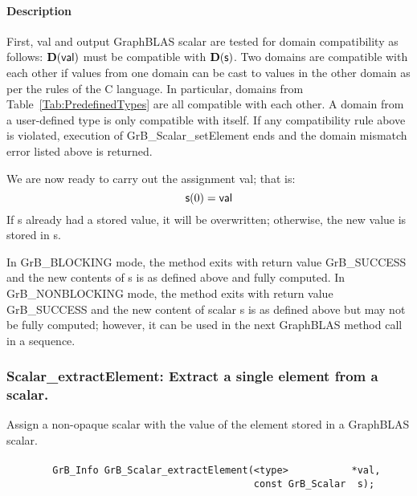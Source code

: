 \paragraph{Description}

First, {\sf val} and output GraphBLAS scalar are tested for domain compatibility as follows:
$\mathbf{D}({\sf val})$ must be compatible with $\mathbf{D}({\sf s})$. Two domains 
are compatible with each other if values from one domain can be cast to values 
in the other domain as per the rules of the C language. In particular, domains 
from Table~\ref{Tab:PredefinedTypes} are all compatible with each other. A domain 
from a user-defined type is only compatible with itself. If any compatibility 
rule above is violated, execution of {\sf GrB\_Scalar\_setElement} ends and 
the domain mismatch error listed above is returned.

We are now ready to carry out the assignment {\sf val}; that is:
\[
    {\sf s}(0) = {\sf val}
\]
If {\sf s} already had a stored value, it will be overwritten; otherwise,
the new value is stored in {\sf s}.

In {\sf GrB\_BLOCKING} mode, the method exits with return value 
{\sf GrB\_SUCCESS} and the new contents of {\sf s} is as defined above
and fully computed.  
In {\sf GrB\_NONBLOCKING} mode, the method exits with return value 
{\sf GrB\_SUCCESS} and the new content of scalar {\sf s} is as defined above 
but may not be fully computed; however, it can be used in the next GraphBLAS 
method call in a sequence.



\subsubsection{{\sf Scalar\_extractElement}: Extract a single element from a scalar.}
\label{Sec:Scalar_extractElement}

Assign a non-opaque scalar with the value of the element stored in a GraphBLAS scalar. 

\paragraph{\syntax}

\begin{verbatim}
        GrB_Info GrB_Scalar_extractElement(<type>           *val,
                                           const GrB_Scalar  s); 
\end{verbatim}

